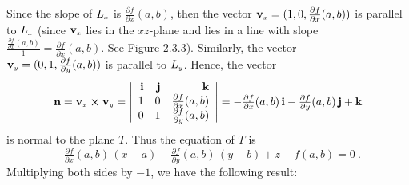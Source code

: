 \piccaption[]{}
\par\noindent Since the slope of
$L_{\scriptscriptstyle x}$ is $\frac{\partial f}{\partial x}(a,b)$, then the vector
$\textbf{v}_{\scriptscriptstyle x}=(1,0,\frac{\partial f}{\partial x}(a,b))$ is parallel to $L_{\scriptscriptstyle x}$ (since
$\textbf{v}_{\scriptscriptstyle x}$ lies in the
$xz$-plane and lies in a line with slope $\frac{\frac{\partial f}{\partial x}(a,b)}{1}=
\frac{\partial f}{\partial x}(a,b)$. See Figure 2.3.3).
Similarly, the vector\\$\textbf{v}_{\scriptscriptstyle y}=(0,1,\frac{\partial f}{\partial y}(a,b))$ is parallel to $L_{\scriptscriptstyle y}$.
Hence, the vector
\begin{displaymath}
 \textbf{n} = \textbf{v}_{\scriptscriptstyle x} \bm{\times} \textbf{v}_{\scriptscriptstyle y} =
  \left|
  \begin{array}{rrr}
   \textbf{i} & \textbf{j} & \textbf{k}\\
   1 & 0 & \tfrac{\partial f}{\partial x}(a,b)\\
   0 & 1 & \tfrac{\partial f}{\partial y}(a,b)
  \end{array}\right|
  = -\tfrac{\partial f}{\partial x}(a,b)\,\textbf{i} - \tfrac{\partial f}{\partial y}(a,b)\,\textbf{j} + \textbf{k}
\end{displaymath}
is normal to the plane $T$. Thus the equation of $T$ is
\begin{equation}
 -\tfrac{\partial f}{\partial x}(a,b)\,(x-a) - \tfrac{\partial f}{\partial y}(a,b)\,(y-b)+z-f(a,b)=0 ~.
\end{equation}
Multiplying both sides by $-1$, we have the following result:\smallskip
{}

